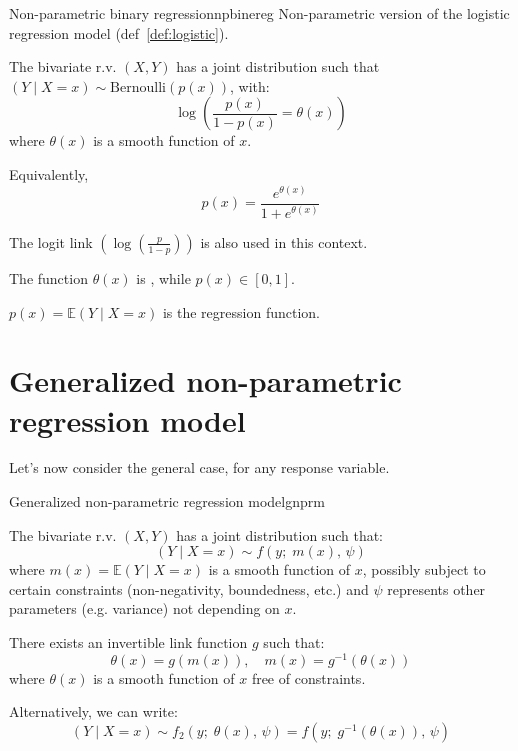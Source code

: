 \begin{definition}{Non-parametric binary regression}{npbinereg} 
    Non-parametric version of the logistic regression model (def~\ref{def:logistic}).

    The bivariate r.v. $(X, Y)$ has a joint distribution such that
    $(Y \mid X = x) \sim \text{Bernoulli}(p(x))$, with:
    \begin{equation*}
        \log\left(
            \frac{p(x)}{1 - p(x)} = \theta(x)
        \right)
    \end{equation*}
    where $\theta(x)$ is a smooth function of $x$.

    Equivalently,
    \begin{equation*}
        p(x) = \frac{e^{\theta(x)}}{1 + e^{\theta(x)}}
    \end{equation*}

    \tcblower

    The logit link $\left(\log\left(\frac{p}{1 - p}\right)\right)$ is also used in this context.

    The function $\theta(x)$ is , while $p(x) \in [0, 1]$.

    $p(x) = \mathds{E}(Y \mid X = x)$ is the regression function.
\end{definition}


\pagebreak
\null
{}%
\section{Generalized non-parametric regression model}%
Let's now consider the general case, for any response variable.

\begin{definition}{Generalized non-parametric regression model}{gnprm}

    The bivariate r.v. $(X, Y)$ has a joint distribution such that:
    \begin{equation*}
        (Y \mid X = x) \sim f(y;\; m(x),\, \psi)
    \end{equation*}
    where $m(x) = \mathds{E}(Y \mid X = x)$ is a smooth function of $x$,
    possibly subject to certain constraints (non-negativity, boundedness, etc.)
    and $\psi$ represents other parameters (e.g. variance) not depending on $x$.

    There exists an invertible link function $g$ such that:
    \begin{equation*}
        \theta(x) = g(m(x)), \quad m(x) = g^{-1}(\theta(x))
    \end{equation*}
    where $\theta(x)$ is a smooth function of $x$ free of constraints.

    \tcblower

    Alternatively, we can write:
    \begin{equation*}
        (Y \mid X = x) \sim f_2(y;\; \theta(x),\, \psi) = f(y;\; g^{-1}(\theta(x)),\, \psi)
    \end{equation*}

\end{definition}

